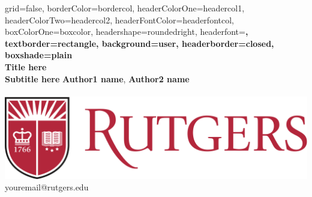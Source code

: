 \documentclass[a0paper,portrait,columns=2]{../includes/tex/baposter}
\begin{document}
\begin{poster}{
  grid=false,
  borderColor=bordercol,         %
  headerColorOne=headercol1,     %
  headerColorTwo=headercol2,     %
  headerFontColor=headerfontcol, %
  boxColorOne=boxcolor,          %
  headershape=roundedright,      %
  headerfont=\Large\sf\bf,       %
  textborder=rectangle,
  background=user,
  headerborder=closed,           %
  boxshade=plain
}
{}
%
%
{
 \sf\bf 
 \phantom{.} \\ 
 \vspace{0.2in}
 \LARGE{Title here} \\ 
 \Large{Subtitle here}
}
{
 \vspace{.6em} 
 \textbf{Author1 name}, 
 \textbf{Author2 name} \\ 
  \\
 {\vspace{-0.4in}\hspace{-7.40in}
  \includegraphics[scale=0.3]{../includes/figs/ru_shield2}\phantom{.}} \\
 {\vspace{-0.20in}\smaller youremail@rutgers.edu} \\
 {\vspace{-0.9in}\hspace{8.05in}
}}
\end{poster}
\end{document}
